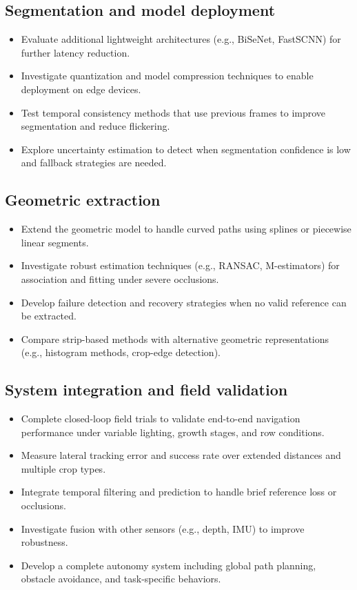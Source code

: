 \subsection{Segmentation and model deployment}
\label{subsec:future_segmentation}

\begin{itemize}
\item Evaluate additional lightweight architectures (e.g., BiSeNet, FastSCNN) for further latency reduction.
\item Investigate quantization and model compression techniques to enable deployment on edge devices.
\item Test temporal consistency methods that use previous frames to improve segmentation and reduce flickering.
\item Explore uncertainty estimation to detect when segmentation confidence is low and fallback strategies are needed.
\end{itemize}

\subsection{Geometric extraction}
\label{subsec:future_geometric}

\begin{itemize}
\item Extend the geometric model to handle curved paths using splines or piecewise linear segments.
\item Investigate robust estimation techniques (e.g., RANSAC, M-estimators) for association and fitting under severe occlusions.
\item Develop failure detection and recovery strategies when no valid reference can be extracted.
\item Compare strip-based methods with alternative geometric representations (e.g., histogram methods, crop-edge detection).
\end{itemize}

\subsection{System integration and field validation}
\label{subsec:future_integration}

\begin{itemize}
\item Complete closed-loop field trials to validate end-to-end navigation performance under variable lighting, growth stages, and row conditions.
\item Measure lateral tracking error and success rate over extended distances and multiple crop types.
\item Integrate temporal filtering and prediction to handle brief reference loss or occlusions.
\item Investigate fusion with other sensors (e.g., depth, IMU) to improve robustness.
\item Develop a complete autonomy system including global path planning, obstacle avoidance, and task-specific behaviors.
\end{itemize}


